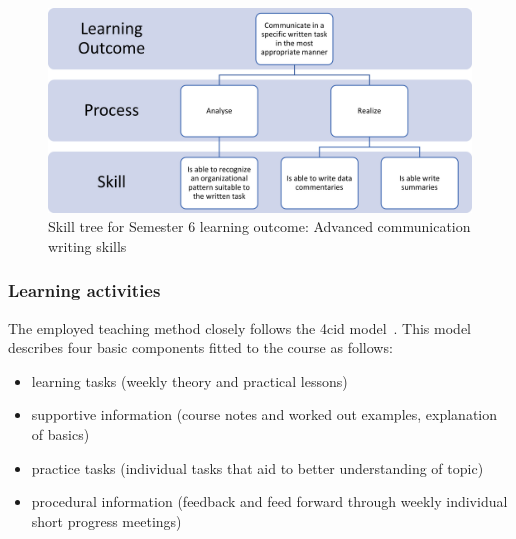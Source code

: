 \begin{figure}[h!]
    \centering
   \includegraphics[width=\textwidth]{appendices/learning_outcomes/LO_S6.png}
    \caption{Skill tree for Semester 6 learning outcome: Advanced communication writing skills}
    \label{fig:LO_S6}
\end{figure}

\subsubsection{Learning activities}

The employed teaching method closely follows the \acrshort{4cid} model~\cite{FHICTTeachingMethods}. This model describes four basic components fitted to the course as follows:
\begin{itemize}
    \item learning tasks (weekly theory and practical lessons)
    \item supportive information (course notes and worked out examples, explanation of basics)
    \item practice tasks (individual tasks that aid to better understanding of topic)
    \item procedural information (feedback and feed forward through weekly individual short progress meetings)
\end{itemize}

